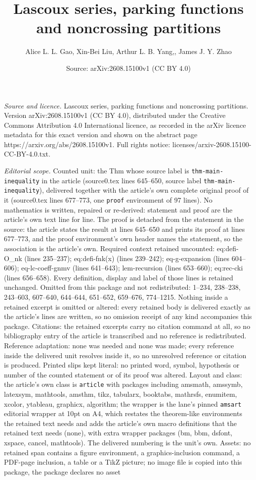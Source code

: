 \documentclass[10pt,a4paper]{amsart}
\title[Lascoux series, parking functions and noncrossing partitions]{Lascoux series, parking functions and noncrossing partitions}
\author{Alice L. L. Gao, Xin-Bei Liu, Arthur L. B. Yang,, James J. Y. Zhao}
\date{Source: arXiv:2608.15100v1 (CC BY 4.0)}
\begin{document}
\maketitle

\noindent\emph{Source and licence.} Lascoux series, parking functions and noncrossing partitions. Version arXiv:2608.15100v1 (CC BY 4.0), distributed under the Creative Commons Attribution 4.0 International licence, as recorded in the arXiv licence metadata for this exact version and shown on the abstract page https://arxiv.org/abs/2608.15100v1. Full rights notice: licenses/arxiv-2608.15100-CC-BY-4.0.txt.\par\smallskip

\noindent\textit{Editorial scope.} Counted unit: the Thm whose source label is \texttt{thm-main-inequality} in the article (source0.tex lines 645--650, source label \texttt{thm-main-inequality}), delivered together with the article's own complete original proof of it (source0.tex lines 677--773, one \texttt{proof} environment of 97 lines). No mathematics is written, repaired or re-derived: statement and proof are the article's own text line for line. The proof is detached from the statement in the source: the article states the result at lines 645--650 and prints its proof at lines 677--773, and the proof environment's own header names the statement, so the association is the article's own. Required context retained uncounted: eq:defi-O\_nk (lines 235--237); eq:defi-fnk(x) (lines 239--242); eq-g-expansion (lines 604--606); eq-lc-coeff-gnmv (lines 641--643); lem-recursion (lines 653--660); eq:rec-cki (lines 656--658). Every definition, display and label of those lines is retained unchanged. Omitted from this package and not redistributed: 1--234, 238--238, 243--603, 607--640, 644--644, 651--652, 659--676, 774--1215. Nothing inside a retained excerpt is omitted or altered: every retained body is delivered exactly as the article's lines are written, so no omission receipt of any kind accompanies this package. Citations: the retained excerpts carry no citation command at all, so no bibliography entry of the article is transcribed and no reference is redistributed. Reference adaptation: none was needed and none was made; every reference inside the delivered unit resolves inside it, so no unresolved reference or citation is produced. Printed slips kept literal: no printed word, symbol, hypothesis or number of the counted statement or of its proof was altered. Layout and class: the article's own class is \texttt{article} with packages including amsmath, amssymb, latexsym, mathtools, amsthm, tikz, tabularx, booktabs, mathrsfs, enumitem, xcolor, ytableau, graphicx, algorithm; the wrapper is the lane's pinned \texttt{amsart} editorial wrapper at 10pt on A4, which restates the theorem-like environments the retained text needs and adds the article's own macro definitions that the retained text needs (none), with extra wrapper packages (bm, bbm, dsfont, xspace, cancel, mathtools). The delivered numbering is the unit's own. Assets: no retained span contains a figure environment, a graphics-inclusion command, a PDF-page inclusion, a table or a TikZ picture; no image file is copied into this package, the package declares no asset 
\end{document}
